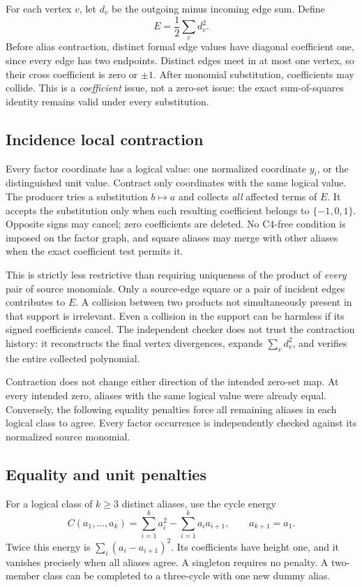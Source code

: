 For each vertex \(v\), let \(d_v\) be the outgoing minus incoming edge
sum. Define
\[
 E=\frac12\sum_v d_v^2.
\]
Before alias contraction, distinct formal edge values have diagonal
coefficient one, since every edge has two endpoints. Distinct edges meet
in at most one vertex, so their cross coefficient is zero or \(\pm1\).
After monomial substitution, coefficients may collide. This is a
\emph{coefficient} issue, not a zero-set issue: the exact sum-of-squares
identity remains valid under every substitution.

\subsection{Incidence local contraction}
Every factor coordinate has a logical value: one normalized coordinate
\(y_i\), or the distinguished unit value. Contract only coordinates with
the same logical value. The producer tries a substitution \(b\mapsto a\)
and collects \emph{all} affected terms of \(E\). It accepts the substitution
only when each resulting coefficient belongs to \(\{-1,0,1\}\).
Opposite signs may cancel; zero coefficients are deleted. No C4-free
condition is imposed on the factor graph, and square aliases may merge
with other aliases when the exact coefficient test permits it.

This is strictly less restrictive than requiring uniqueness of the
product of \emph{every} pair of source monomials. Only a source-edge
square or a pair of incident edges contributes to \(E\). A collision
between two products not simultaneously present in that support is
irrelevant. Even a collision in the support can be harmless if its signed
coefficients cancel. The independent checker does not trust the contraction
history: it reconstructs the final vertex divergences, expands
\(\sum_vd_v^2\), and verifies the entire collected polynomial.

Contraction does not change either direction of the intended zero-set
map. At every intended zero, aliases with the same logical value were
already equal. Conversely, the following equality penalties force all
remaining aliases in each logical class to agree. Every factor occurrence
is independently checked against its normalized source monomial.

\subsection{Equality and unit penalties}
For a logical class of \(k\geq3\) distinct aliases, use the cycle energy
\[
 C(a_1,\ldots,a_k)=\sum_{i=1}^k a_i^2-
                  \sum_{i=1}^k a_i a_{i+1},\qquad a_{k+1}=a_1.
\]
Twice this energy is \(\sum_i(a_i-a_{i+1})^2\). Its coefficients have
height one, and it vanishes precisely when all aliases agree. A singleton
requires no penalty. A two-member class can be completed to a three-cycle
with one new dummy alias.

